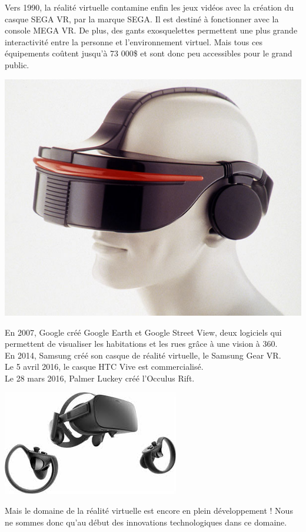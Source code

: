 \documentclass[12pt, a4paper]{report}
\begin{document}
Vers 1990, la réalité virtuelle contamine enfin les jeux vidéos avec la création du casque SEGA VR, par la marque SEGA. Il est destiné à fonctionner avec la console MEGA VR. De plus, des gants exosquelettes permettent une plus grande interactivité entre la personne et l'environnement virtuel. Mais tous ces équipements coûtent jusqu'à 73 000\$ et sont donc peu accessibles pour le grand public.
\begin{center}
\includegraphics[scale=0.3]{sega.jpg}
\end{center}

En 2007, Google créé Google Earth et Google Street View, deux logiciels qui permettent de visualiser les habitations et les rues grâce à une vision à 360\degres{}.\\
En 2014, Samsung créé son casque de réalité virtuelle, le Samsung Gear VR.\\
Le 5 avril 2016, le casque HTC Vive est commercialisé.\\
Le 28 mars 2016, Palmer Luckey créé l'Occulus Rift.
\begin{center}
\includegraphics[scale=0.5]{occulus.jpeg}
\end{center}
Mais le domaine de la réalité virtuelle est encore en plein développement !
Nous ne sommes donc qu'au début des innovations technologiques dans ce domaine.
\end{document}
